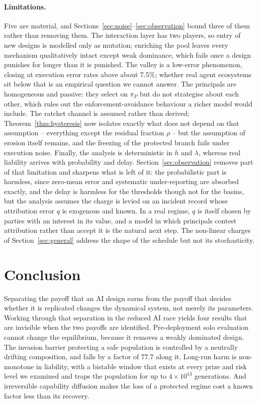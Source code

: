 \documentclass[11pt,a4paper]{article}
\theoremstyle{definition}
\newcommand{\piP}{\pi_{P}}
\begin{document}
\paragraph{Limitations.}
Five are material, and Sections~\ref{sec:noise}--\ref{sec:observation} bound three
of them rather than removing them. The interaction layer has two players, so
entry of new designs is modelled only as mutation; enriching the pool leaves
every mechanism qualitatively intact except weak dominance, which fails once a
design punishes for longer than it is punished. The valley is a low-error
phenomenon, closing at execution error rates above about $7.5\%$; whether real
agent ecosystems sit below that is an empirical question we cannot answer.
The principals are homogeneous and passive: they select on $\piP$ but do not
strategise about each other, which rules out the enforcement-avoidance
behaviour a richer model would include. The ratchet channel is assumed rather
than derived; Theorem~\ref{thm:hysteresis} now isolates exactly what does not
depend on that assumption -- everything except the residual fraction $\rho$ --
but the assumption of erosion itself remains, and the freezing of the
protected branch fails under execution noise. Finally, the analysis is
deterministic in $h$ and $\lambda$, whereas real liability arrives with
probability and delay. Section~\ref{sec:observation} removes part of that
limitation and sharpens what is left of it: the probabilistic part is
harmless, since zero-mean error and systematic under-reporting are absorbed
exactly, and the delay is harmless for the thresholds though not for the
basins, but the analysis assumes the charge is levied on an incident record
whose attribution error $q$ is exogenous and known. In a real regime, $q$ is
itself chosen by parties with an interest in its value, and a model in which
principals contest attribution rather than accept it is the natural next step.
The non-linear charges of Section~\ref{sec:general} address the shape of the
schedule but not its stochasticity.

\section{Conclusion}\label{sec:conclusion}

Separating the payoff that an AI design earns from the payoff that decides
whether it is replicated changes the dynamical system, not merely its
parameters. Working through that separation in the reduced AI race yields four
results that are invisible when the two payoffs are identified. Pre-deployment
solo evaluation cannot change the equilibrium, because it removes a weakly
dominated design. The invasion barrier protecting a safe population is
controlled by a neutrally drifting composition, and falls by a factor of
$77.7$ along it. Long-run harm is non-monotone in liability, with a bistable
window that exists at every prize and risk level we examined and traps the
population for up to $4\times10^{13}$ generations. And irreversible capability
diffusion makes the loss of a protected regime cost a known factor less than
its recovery.
\end{document}
